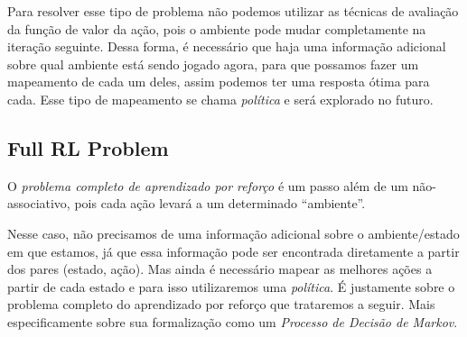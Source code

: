 \documentclass{article}
\begin{document}
            \begin{center}
                \associativebandits
            \end{center}
            
            Para resolver esse tipo de problema não podemos utilizar as técnicas de avaliação da função de valor da ação, pois o ambiente pode mudar completamente na iteração seguinte. Dessa forma, é necessário que haja uma informação adicional sobre qual ambiente está sendo jogado agora, para que possamos fazer um mapeamento de cada um deles, assim podemos ter uma resposta ótima para cada. Esse tipo de mapeamento se chama \emph{política} e será explorado no futuro.
            
        \subsection{Full RL Problem}
        
            O \emph{problema completo de aprendizado por reforço} é um passo além de um não-associativo, pois cada ação levará a um determinado ``ambiente''. 
        
            \begin{center}
                \fullrldiagram
            \end{center}
            
            Nesse caso, não precisamos de uma informação adicional sobre o ambiente/estado em que estamos, já que essa informação pode ser encontrada diretamente a partir dos pares (estado, ação). Mas ainda é necessário mapear as melhores ações a partir de cada estado e para isso utilizaremos uma \emph{política}. É justamente sobre o problema completo do aprendizado por reforço que trataremos a seguir. Mais especificamente sobre sua formalização como um \emph{Processo de Decisão de Markov}.
\end{document}
